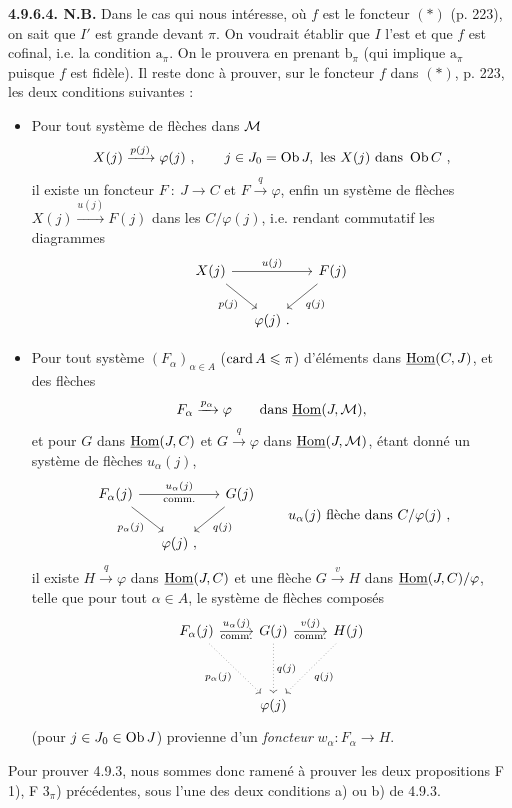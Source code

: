 \textbf{4.9.6.4. N.B.} Dans le cas qui nous intéresse, où $f$ est le foncteur $(*)$ (p. 223), on sait que $I'$ est grande devant $\pi$. On voudrait établir que $I$ l'est et que $f$ est cofinal, i.e. la condition $\mathrm{a}_\pi$. On le prouvera en prenant $\mathrm{b}_\pi$ (qui implique $\mathrm{a}_\pi$ puisque $f$ est fidèle). Il reste donc à
prouver, sur le foncteur $f$ dans $(*)$, p. 223, les deux conditions suivantes :
\begin{itemize}[label={}]
\item[F 1)] Pour tout système de flèches dans $\mathcal{M}$
\[
X(j) \xrightarrow{p(j)} \varphi(j) \ , \qquad j \in J_0 = \operatorname{Ob} J, \text{ les } X(j) \text{ dans } \operatorname{Ob} C \ ,
\]
il existe un foncteur $F \ : \ J \longrightarrow C$ et $F \xrightarrow{q} \varphi$, enfin un système de flèches $X(j) \xrightarrow{u(j)} F(j)$ dans les $C/\varphi(j)$, i.e. rendant commutatif les diagrammes %
\[
\begin{tikzcd}[column sep=small]
X(j) \arrow[rr, "u(j)"] \arrow[dr, "p(j)"'] & & F(j) \arrow[dl, "q(j)"] \\
& \varphi(j)\ . &
\end{tikzcd}
\]
\item[F $3_\pi$)] Pour tout système $(F_\alpha)_{\alpha \in A}$ ($\operatorname{card} A \leqslant \pi$) d'éléments dans $\underline{\mathrm{Hom}}(C,J)$, et des flèches %
\[
F_\alpha \xrightarrow{p_\alpha} \varphi \qquad \text{dans } \underline{\mathrm{Hom}}(J,\mathcal{M}),
\]
et pour $G$ dans $\underline{\mathrm{Hom}}(J,C)$ et $G \xrightarrow{q} \varphi$ dans $\underline{\mathrm{Hom}}(J,\mathcal{M})$, étant donné un système de flèches $u_\alpha(j)$,
\[
\begin{tikzcd}[column sep=small]
F_\alpha(j) \arrow[rr, "u_\alpha(j)", "\text{comm.}"'] \arrow[dr, "p_\alpha(j)"'] & & G(j) \arrow[dl, "q(j)"] \\
& \varphi(j)\ , &
\end{tikzcd}
\qquad u_\alpha(j) \text{ flèche dans } C/\varphi(j) \ ,
\]
il existe $H \xrightarrow{q} \varphi$ dans $\underline{\mathrm{Hom}}(J,C)$ et une flèche $G \xrightarrow{v} H$ dans $\underline{\mathrm{Hom}}(J,C)/\varphi$, telle que pour tout $\alpha \in A$, le système de flèches composés
\[
\begin{tikzcd}[row sep=huge]
F_\alpha(j) \arrow[r, "u_\alpha(j)", "\text{comm.}"'] \arrow[dr, dotted, "p_\alpha(j)"'] & G(j) \arrow[r, "v(j)", "\text{comm.}"'] \arrow[d, dotted, "q(j)"] & H(j) \arrow[dl, dotted, "q(j)"] \\
& \varphi(j) &
\end{tikzcd}
\]
(pour $j \in J_0 \in \operatorname{Ob} J$) provienne d'un \textit{foncteur} $w_\alpha : F_\alpha \longrightarrow H$. %
\end{itemize}
Pour prouver 4.9.3, nous sommes donc ramené à prouver les deux propositions F 1), F $3_\pi$) précédentes, sous l'une des deux conditions a) ou b) de 4.9.3.

